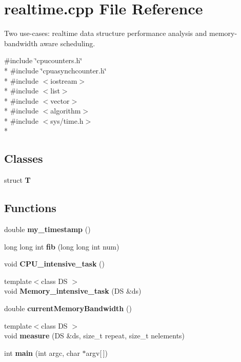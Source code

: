 \section{realtime.\+cpp File Reference}
\label{realtime_8cpp}


Two use-\/cases\+: realtime data structure performance analysis and memory-\/bandwidth aware scheduling.  


{\ttfamily \#include \char`\"{}cpucounters.\+h\char`\"{}}\\*
{\ttfamily \#include \char`\"{}cpuasynchcounter.\+h\char`\"{}}\\*
{\ttfamily \#include $<$iostream$>$}\\*
{\ttfamily \#include $<$list$>$}\\*
{\ttfamily \#include $<$vector$>$}\\*
{\ttfamily \#include $<$algorithm$>$}\\*
{\ttfamily \#include $<$sys/time.\+h$>$}\\*
\subsection*{Classes}
\begin{DoxyCompactItemize}
\item 
struct {\bf T}
\end{DoxyCompactItemize}
\subsection*{Functions}
\begin{DoxyCompactItemize}
\item 
double {\bfseries my\+\_\+timestamp} ()\label{realtime_8cpp_ab6b2adca133c5e31dca366cdc686edbe}

\item 
long long int {\bfseries fib} (long long int num)\label{realtime_8cpp_a26067fd04774b9351f8ad25314b01077}

\item 
void {\bfseries C\+P\+U\+\_\+intensive\+\_\+task} ()\label{realtime_8cpp_ae78e322a91d8697aeb883161ad21e77b}

\item 
{\footnotesize template$<$class D\+S $>$ }\\void {\bfseries Memory\+\_\+intensive\+\_\+task} (D\+S \&ds)\label{realtime_8cpp_a722f2b5a21f9cb12dae7790963a0cdba}

\item 
double {\bfseries current\+Memory\+Bandwidth} ()\label{realtime_8cpp_a48c3e8e5a58ab1456c875c332a2df4b9}

\item 
{\footnotesize template$<$class D\+S $>$ }\\void {\bfseries measure} (D\+S \&ds, size\+\_\+t repeat, size\+\_\+t nelements)\label{realtime_8cpp_a6e4dd9241429371cfcb1d2b3127ea7a8}

\item 
int {\bfseries main} (int argc, char $\ast$argv[$\,$])\label{realtime_8cpp_a0ddf1224851353fc92bfbff6f499fa97}

\end{DoxyCompactItemize}

